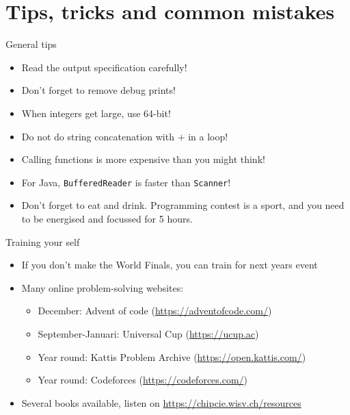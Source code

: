 \documentclass[11pt,pdf, aspectratio=169]{beamer}
\begin{document}
  \section{Tips, tricks and common mistakes}
  \begin{frame}{General tips}
    \begin{itemize}
      \item Read the output specification carefully!
      \item Don’t forget to remove debug prints!
      \item When integers get large, use 64-bit!
      \item Do not do string concatenation with $+$ in a loop!
      \item Calling functions is more expensive than you might think!
      \item For Java, \texttt{BufferedReader} is faster than \texttt{Scanner}!
      \item Don’t forget to eat and drink.
      Programming contest is a sport, and you need to be energised and focussed for 5 hours.
    \end{itemize}
  \end{frame}
  \begin{frame}{Training your self}
    \begin{itemize}
      \item If you don't make the World Finals, you can train for next years event
      \item Many online problem-solving websites:
      \begin{itemize}
        \item December: Advent of code (\url{https://adventofcode.com/})
        \item September-Januari: Universal Cup (\url{https://ucup.ac})
        \item Year round: Kattis Problem Archive (\url{https://open.kattis.com/})
        \item Year round: Codeforces (\url{https://codeforces.com/})
      \end{itemize}
      \item Several books available, listen on \url{https://chipcie.wisv.ch/resources}
    \end{itemize}
  \end{frame}
\end{document}

